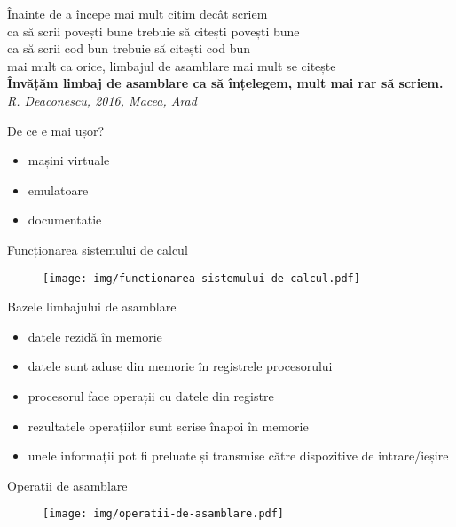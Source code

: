 \documentclass{beamer}
\begin{document}
\begin{frame}{Înainte de a începe}
  \centering
  \pause mai mult citim decât scriem \\
  \pause ca să scrii povești bune trebuie să citești povești bune \\
  \pause ca să scrii cod bun trebuie să citești cod bun \\
  \pause mai mult ca orice, limbajul de asamblare mai mult se citește \\
  \vspace{1cm}
  \pause \textbf{Învățăm limbaj de asamblare ca să înțelegem, mult mai rar să scriem.} \\
  \hfill \textit{R. Deaconescu, 2016, Macea, Arad}
\end{frame}

\begin{frame}{De ce e mai ușor?}
  \begin{itemize}
    \item mașini virtuale
    \item emulatoare
    \item documentație
  \end{itemize}
\end{frame}

\begin{frame}{Funcționarea sistemului de calcul}
  \begin{figure}
    \centering
    \texttt{[image: img/functionarea-sistemului-de-calcul.pdf]}
  \end{figure}
\end{frame}

\begin{frame}{Bazele limbajului de asamblare}
  \begin{itemize}
    \pause \item datele rezidă în memorie
    \pause \item datele sunt aduse din memorie în registrele procesorului
    \pause \item procesorul face operații cu datele din registre
    \pause \item rezultatele operațiilor sunt scrise înapoi în memorie
    \pause \item unele informații pot fi preluate și transmise către dispozitive de intrare/ieșire
  \end{itemize}
\end{frame}

\begin{frame}{Operații de asamblare}
  \begin{figure}
    \centering
    \texttt{[image: img/operatii-de-asamblare.pdf]}
  \end{figure}
\end{frame}
\end{document}
